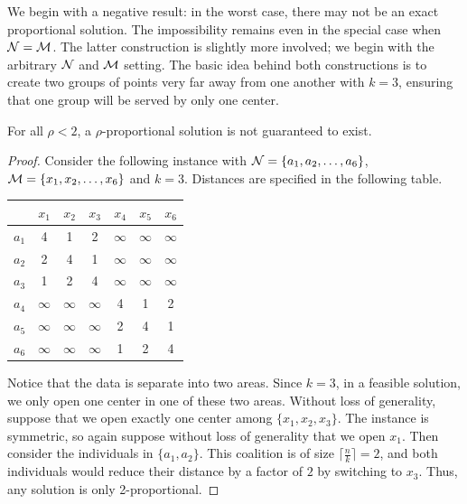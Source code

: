 We begin with a negative result: in the worst case, there may not be an exact proportional solution. The impossibility remains even in the special case when $\mathcal {N} = \mathcal{M}$. The latter construction is slightly more involved; we begin with the arbitrary $\mathcal {N}$ and $\mathcal{M}$ setting. The basic idea behind both constructions is to create two groups of points very far away from one another with $k=3$, ensuring that one group will be served by only one center. 

\begin{claim}
\label{claim:lowerBound}
	For all $\rho < 2$, a $\rho$-proportional solution is not guaranteed to exist.
\end{claim}
\begin{proof}
	Consider the following instance with $\mathcal {N} = \{a_1,  a_2, \hdots, a_6\}$, $\mathcal{M} = \{x_1, x_2, \hdots, x_6\}$ and $k=3$. Distances are specified in the following table.
\begin{center}
  \begin{tabular}{|c || c | c | c | c | c | c  |} 
  \hline 
         & $x_1$   & $x_2$  & $x_3$    & $x_4$  & $x_5$   & $x_6$   \\ \hline \hline
  $a_1$ &  4     & 1 & 2    & $\infty$ & $\infty$ & $\infty$  \\ \hline
  $a_2$ & 2    &   4    & 1  & $\infty$ & $\infty$ & $\infty$  \\ \hline  
  $a_3$ & 1  &  2  &   4     & $\infty$ & $\infty$ & $\infty$  \\ \hline
  $a_4$ & $\infty$ & $\infty$ & $\infty$ &    4    & 1 &  2    \\ \hline
  $a_5$ & $\infty$ & $\infty$ & $\infty$ &   2  &    4   & 1   \\ \hline
  $a_6$ & $\infty$ & $\infty$ & $\infty$ & 1  &  2  &   4       \\ \hline
\end{tabular}
\end{center}

Notice that the data is separate into two areas. Since $k=3$, in a feasible solution, we only open one center in one of these two areas. Without loss of generality, suppose that we open exactly one center among $\{x_1, x_2, x_3\}$. The instance is symmetric, so again suppose without loss of generality that we open $x_1$. Then consider the individuals in $\{a_1, a_2\}$. This coalition is of size $\lceil \frac{n}{k} \rceil = 2$, and both individuals would reduce their distance by a factor of $2$ by switching to $x_3$. Thus, any solution is only 2-proportional. 
\end{proof}


